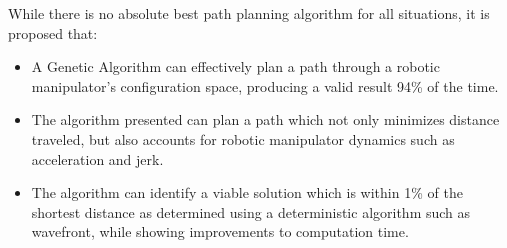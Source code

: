 While there is no absolute best path planning algorithm for all situations, it is proposed that:

\begin{itemize}
	\item A Genetic Algorithm can effectively plan a path through a robotic manipulator's configuration space, producing a valid result 94\% of the time.
	\item The algorithm presented can plan a path which not only minimizes distance traveled, but also accounts for robotic manipulator dynamics such as acceleration and jerk.
	\item The algorithm can identify a viable solution which is within 1\% of the shortest distance as determined using a deterministic algorithm such as wavefront, while showing improvements to computation time.
\end{itemize}
